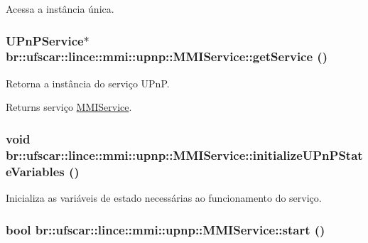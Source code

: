 Acessa a instância única. 

\hypertarget{classbr_1_1ufscar_1_1lince_1_1mmi_1_1upnp_1_1MMIService_aadd21fd9892177f42ca1e002b5dc6432}{
\subsubsection[{getService}]{\setlength{\rightskip}{0pt plus 5cm}UPnPService$\ast$ br::ufscar::lince::mmi::upnp::MMIService::getService ()}}
\label{classbr_1_1ufscar_1_1lince_1_1mmi_1_1upnp_1_1MMIService_aadd21fd9892177f42ca1e002b5dc6432}


Retorna a instância do serviço UPnP. 

\begin{DoxyReturn}{Returns}
serviço \hyperlink{classbr_1_1ufscar_1_1lince_1_1mmi_1_1upnp_1_1MMIService}{MMIService}. 
\end{DoxyReturn}
\hypertarget{classbr_1_1ufscar_1_1lince_1_1mmi_1_1upnp_1_1MMIService_a0163a8a90ce5a43daad480795d323f5c}{
\subsubsection[{initializeUPnPStateVariables}]{\setlength{\rightskip}{0pt plus 5cm}void br::ufscar::lince::mmi::upnp::MMIService::initializeUPnPStateVariables ()}}
\label{classbr_1_1ufscar_1_1lince_1_1mmi_1_1upnp_1_1MMIService_a0163a8a90ce5a43daad480795d323f5c}


Inicializa as variáveis de estado necessárias ao funcionamento do serviço. 

\hypertarget{classbr_1_1ufscar_1_1lince_1_1mmi_1_1upnp_1_1MMIService_a34c70b44f4b7491dc2e9a398423ef974}{
\subsubsection[{start}]{\setlength{\rightskip}{0pt plus 5cm}bool br::ufscar::lince::mmi::upnp::MMIService::start ()}}
\label{classbr_1_1ufscar_1_1lince_1_1mmi_1_1upnp_1_1MMIService_a34c70b44f4b7491dc2e9a398423ef974}


